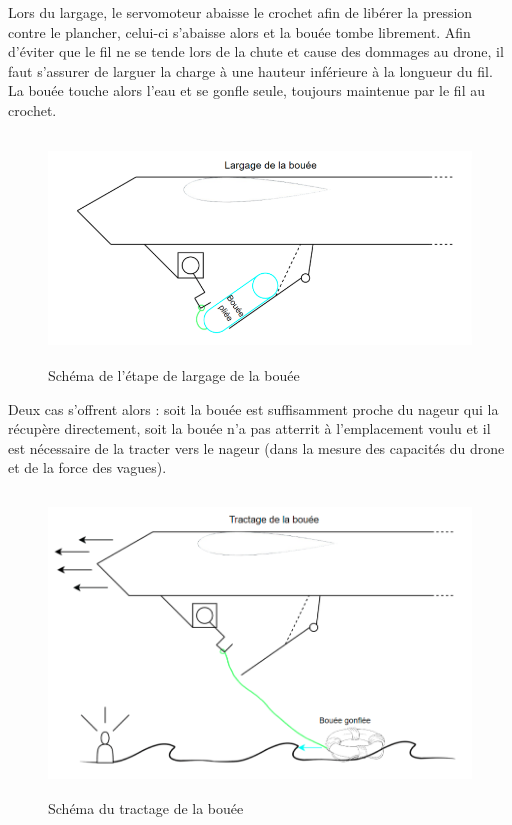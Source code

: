 \documentclass[a4paper,12pt,french]{report}
\begin{document}
Lors du largage, le servomoteur abaisse le crochet afin de libérer la pression contre le plancher, celui-ci s’abaisse alors et la bouée tombe librement. Afin d’éviter que le fil ne se tende lors de la chute et cause des dommages au drone, il faut s’assurer de larguer la charge à une hauteur inférieure à la longueur du fil. La bouée touche alors l’eau et se gonfle seule, toujours maintenue par le fil au crochet.\newline

\begin{figure}[h]
    \centering
    \includegraphics[height=6cm]{figures/b2.png}
    \caption{Schéma de l'étape de largage de la bouée}
\end{figure}

Deux cas s’offrent alors : soit la bouée est suffisamment proche du nageur qui la récupère directement, soit la bouée n’a pas atterrit à l’emplacement voulu et il est nécessaire de la tracter vers le nageur (dans la mesure des capacités du drone et de la force des vagues).\newline

\newpage
\begin{figure}[h]
    \centering
    \includegraphics[height=8cm]{figures/b3.png}
    \caption{Schéma du tractage de la bouée}
\end{figure}
\end{document}
